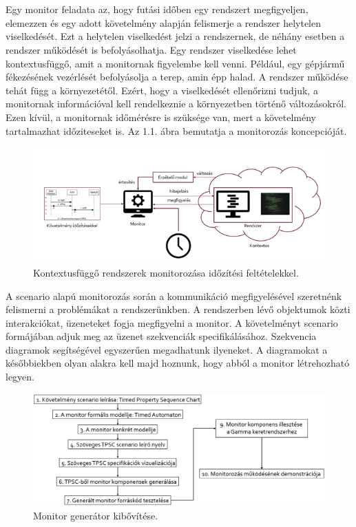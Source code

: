 \chapter{\bevezetes}

Egy monitor feladata az, hogy futási időben egy rendszert megfigyeljen, elemezzen és egy adott követelmény alapján felismerje a rendszer helytelen viselkedését.
Ezt a helytelen viselkedést jelzi a rendszernek, de néhány esetben a rendszer működését is befolyásolhatja.
Egy rendszer viselkedése lehet kontextusfüggő, amit a monitornak figyelembe kell venni.
Például, egy gépjármű fékezésének vezérlését befolyásolja a terep, amin épp halad.
A rendszer működése tehát függ a környezetétől.
Ezért, hogy a viselkedését ellenőrizni tudjuk, a monitornak információval kell rendelkeznie a környezetben történő változásokról.
Ezen kívül, a monitornak időmérésre is szüksége van, mert a követelmény tartalmazhat időziteseket is.
Az 1.1. ábra bemutatja a monitorozás koncepcióját.

\begin{figure}[!ht]
    \centering
    \includegraphics[width=150mm, keepaspectratio]{figures/1abra.png}
    \caption{Kontextusfüggő rendszerek monitorozása időzítési feltételekkel.}
\end{figure}

A scenario alapú monitorozás során a kommunikáció megfigyelésével szeretnénk felismerni a problémákat a rendszerünkben.
A rendszerben lévő objektumok közti interakciókat, üzeneteket fogja megfigyelni a monitor.
A követelményt scenario formájában adjuk meg az üzenet szekvenciák specifikálásához.
Szekvencia diagramok segítségével egyszerűen megadhatunk ilyeneket.
A diagramokat a későbbiekben olyan alakra kell majd hoznunk, hogy abból a monitor létrehozható legyen.

\begin{figure}[!ht]
    \centering
    \includegraphics[width=150mm, keepaspectratio]{figures/generation_plan.png}
    \caption{Monitor generátor kibővítése.}
\end{figure}


